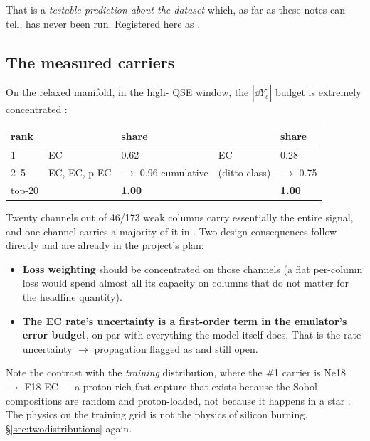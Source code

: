 That is a \emph{testable prediction about the dataset} which, as far as these
notes can tell, has never been run. Registered here as .

\subsection{The measured \texorpdfstring{\Ye}{Ye} carriers}
\label{sec:yecarriers}

On the relaxed manifold, in the high-\Ye{} QSE window, the $|\dd\dot Y_e|$
budget is extremely concentrated :

\begin{center}
\begingroup\small
\begin{tabularx}{\textwidth}{@{}L{1.3cm} L{4.0cm} L{3.0cm} Y L{2.4cm}@{}}
\toprule
\textbf{rank} & \textbf{} & \textbf{share} & \textbf{} &
  \textbf{share} \\
 &  EC & 0.62 &  EC & 0.28 \\
2--5 &  EC,  EC, p EC & $\to$ 0.96 cumulative &
  (ditto class) & $\to$ 0.75 \\
top-20 & & \textbf{1.00} & & \textbf{1.00} \\
\bottomrule
\end{tabularx}
\endgroup
\end{center}

Twenty channels out of 46/173 weak columns carry essentially the entire \Ye{}
signal, and one channel carries a majority of it in . Two design
consequences follow directly and are already in the project's plan:

\begin{itemize}
\item \textbf{Loss weighting} should be concentrated on those channels (a flat
  per-column loss would spend almost all its capacity on columns that do not
  matter for the headline quantity).
\item \textbf{The  EC rate's uncertainty is a first-order term in
  the emulator's error budget}, on par with everything the model itself does.
  That is the rate-uncertainty $\to$ \Ye{} propagation flagged as
   and still open.
\end{itemize}

Note the contrast with the \emph{training} distribution, where the \#1 carrier
is Ne18 $\to$ F18 EC --- a proton-rich fast capture that exists because the
Sobol compositions are random and proton-loaded, not because it happens in a
star . The \Ye{} physics on the training grid is not the
\Ye{} physics of silicon burning. \S\ref{sec:twodistributions} again.

